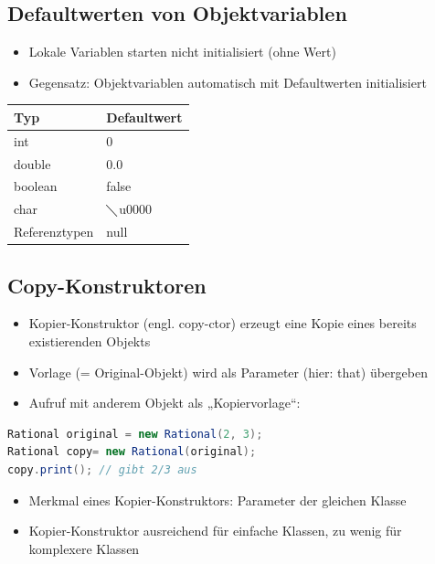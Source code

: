 \subsection{Defaultwerten von Objektvariablen}
\begin{itemize}
\item Lokale Variablen starten nicht initialisiert (ohne Wert)
\item Gegensatz: Objektvariablen automatisch mit Defaultwerten initialisiert
\end{itemize}
\begin{tabular}{l|l}
Typ & Defaultwert \\ \hline
int & 0\\
double & 0.0\\
boolean & false \\
char & $\diagdown$u0000\\
Referenztypen & null\\
\end{tabular}

\subsection{Copy-Konstruktoren}
\begin{itemize}
\item Kopier-Konstruktor (engl. copy-ctor) erzeugt eine Kopie eines bereits existierenden Objekts
\item Vorlage (= Original-Objekt) wird als Parameter (hier: that) übergeben
\item Aufruf mit anderem Objekt als „Kopiervorlage“:
\end{itemize}
\begin{lstlisting}[language=JAVA]
Rational original = new Rational(2, 3);
Rational copy= new Rational(original);
copy.print(); // gibt 2/3 aus
\end{lstlisting}
\begin{itemize}
\item Merkmal eines Kopier-Konstruktors: Parameter der gleichen Klasse
\item Kopier-Konstruktor ausreichend für einfache Klassen, zu wenig für komplexere Klassen
\end{itemize}

